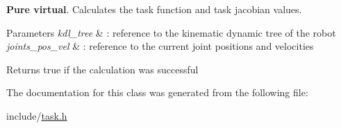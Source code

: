 {\bfseries Pure virtual}. Calculates the task function and task jacobian values. 


\begin{DoxyParams}{Parameters}
{\em kdl\-\_\-tree} & \-: reference to the kinematic dynamic tree of the robot \\
\hline
{\em joints\-\_\-pos\-\_\-vel} & \-: reference to the current joint positions and velocities\\
\hline
\end{DoxyParams}
\begin{DoxyReturn}{Returns}
true if the calculation was successful 
\end{DoxyReturn}


The documentation for this class was generated from the following file\-:\begin{DoxyCompactItemize}
\item 
include/\hyperlink{task_8h}{task.\-h}\end{DoxyCompactItemize}
